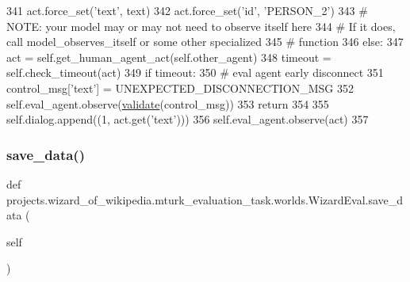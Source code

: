 \begin{DoxyCode}
341                 act.force\_set(\textcolor{stringliteral}{'text'}, text)
342                 act.force\_set(\textcolor{stringliteral}{'id'}, \textcolor{stringliteral}{'PERSON\_2'})
343                 \textcolor{comment}{# NOTE: your model may or may not need to observe itself here}
344                 \textcolor{comment}{# If it does, call model\_observes\_itself or some other specialized}
345                 \textcolor{comment}{# function}
346             \textcolor{keywordflow}{else}:
347                 act = self.get\_human\_agent\_act(self.other\_agent)
348                 timeout = self.check\_timeout(act)
349                 \textcolor{keywordflow}{if} timeout:
350                     \textcolor{comment}{# eval agent early disconnect}
351                     control\_msg[\textcolor{stringliteral}{'text'}] = UNEXPECTED\_DISCONNECTION\_MSG
352                     self.eval\_agent.observe(\hyperlink{namespaceparlai_1_1core_1_1worlds_afc3fad603b7bce41dbdc9cdc04a9c794}{validate}(control\_msg))
353                     \textcolor{keywordflow}{return}
354 
355             self.dialog.append((1, act.get(\textcolor{stringliteral}{'text'})))
356             self.eval\_agent.observe(act)
357 
\end{DoxyCode}
\mbox{\label{classprojects_1_1wizard__of__wikipedia_1_1mturk__evaluation__task_1_1worlds_1_1WizardEval_af2db699f6af0f8b441fbf280c5b12302}} 
\subsubsection{\texorpdfstring{save\+\_\+data()}{save\_data()}}
{\footnotesize\ttfamily def projects.\+wizard\+\_\+of\+\_\+wikipedia.\+mturk\+\_\+evaluation\+\_\+task.\+worlds.\+Wizard\+Eval.\+save\+\_\+data (\begin{DoxyParamCaption}\item[{}]{self }\end{DoxyParamCaption})}



